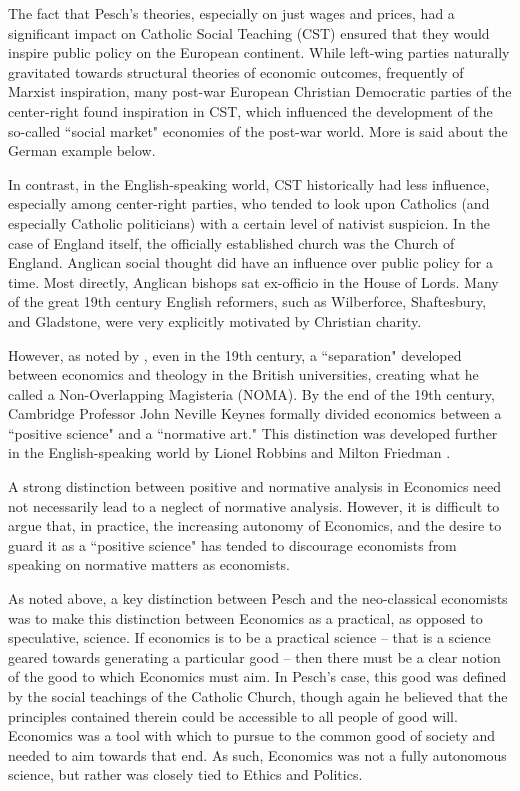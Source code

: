 \documentclass{article}
\begin{document}
The fact that Pesch’s theories, especially on just wages and prices, had a significant impact on Catholic Social Teaching (CST) ensured that they would inspire public policy on the European continent.  While left-wing parties naturally gravitated towards structural theories of economic outcomes, frequently of Marxist inspiration, many post-war European Christian Democratic parties of the center-right found inspiration in CST, which influenced the development of the so-called ``social market" economies of the post-war world.  More is said about the German example below.\medskip

In contrast, in the English-speaking world, CST historically had less influence, especially among center-right parties, who tended to look upon Catholics (and especially Catholic politicians) with a certain level of nativist suspicion.  In the case of England itself, the officially established church was the Church of England.  Anglican social thought did have an influence over public policy for a time.  Most directly, Anglican bishops sat ex-officio in the House of Lords.  Many of the great 19th century English reformers, such as Wilberforce, Shaftesbury, and Gladstone, were very explicitly motivated by Christian charity. \citep{hawtrey2014}\medskip

However, as noted by \citet{emmett2014}, even in the 19th century, a ``separation" developed between economics and theology in the British universities, creating what he called a Non-Overlapping Magisteria (NOMA).  By the end of the 19th century, Cambridge Professor John Neville Keynes formally divided economics between a ``positive science" and a ``normative art." \citep{keynes1904}  This distinction was developed further in the English-speaking world by Lionel Robbins \citep{robbins1932} and Milton Friedman \citep{friedman1953}.\medskip

A strong distinction between positive and normative analysis in Economics need not necessarily lead to a neglect of normative analysis.  However, it is difficult to argue that, in practice, the increasing autonomy of Economics, and the desire to guard it as a ``positive science" has tended to discourage economists from speaking on normative matters as economists.\medskip

As noted above, a key distinction between Pesch and the neo-classical economists was to make this distinction between Economics as a practical, as opposed to speculative, science.  If economics is to be a practical science – that is a science geared towards generating a particular good – then there must be a clear notion of the good to which Economics must aim.  In Pesch’s case, this good was defined by the social teachings of the Catholic Church, though again he believed that the principles contained therein could be accessible to all people of good will.    Economics was a tool with which to pursue to the common good of society and needed to aim towards that end.  As such, Economics was not a fully autonomous science, but rather was closely tied to Ethics and Politics.\medskip
\end{document}
